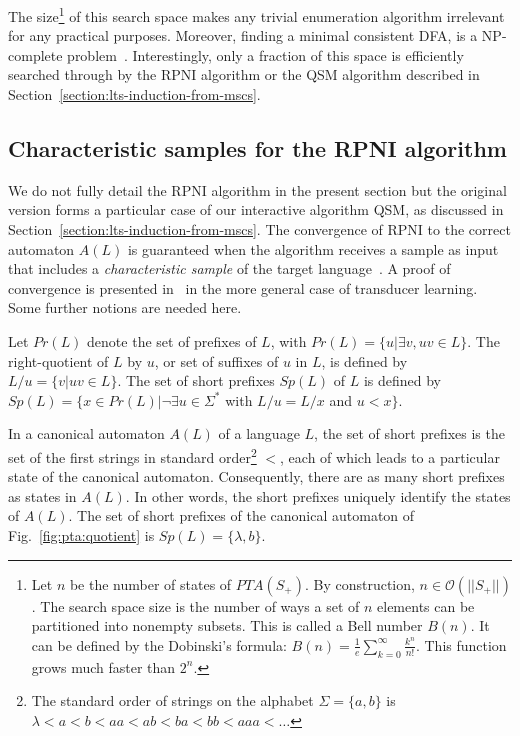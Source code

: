 The size\footnote{Let $n$ be the number of states of $PTA(S_+)$. By construction, $n \in \mathcal{O}(||S_+||)$. The search space size is the number of ways a set of $n$ elements can be partitioned into nonempty subsets. This is called a Bell number $B(n)$. It can be defined by the Dobinski's formula: $B(n) = \frac{1}{e} \sum_{k=0}^{\infty} \frac{k^n}{n!}$. This function grows much faster than $2^n$.} of this search space makes any trivial enumeration algorithm irrelevant for any practical purposes. Moreover, finding a minimal consistent DFA, is a NP-complete problem~\cite{Gold:1978,Angluin:1978}. Interestingly, only a fraction of this space is efficiently searched through by the RPNI algorithm or the \textsc{QSM} algorithm described in Section~\ref{section:lts-induction-from-mscs}.

\subsection{Characteristic samples for the RPNI algorithm\label{subsection:gi-background-rpni}}

We do not fully detail the RPNI algorithm in the present section but the original version forms a particular case
of our interactive algorithm \textsc{QSM}, as discussed in Section~\ref{section:lts-induction-from-mscs}. The convergence of RPNI to the correct automaton $A(L)$ is guaranteed when the algorithm receives a sample as input that includes a \textsl{characteristic sample} of the target language~\cite{Oncina:1992}. A proof of convergence is presented in~\cite{Oncina:1993} in the more general case of transducer learning. Some further notions are needed here.

\begin{definition} 
Let $Pr(L)$ denote the set of prefixes of $L$, with $Pr(L) = \{u | \exists v, uv \in L\}$. The right-quotient of $L$ by $u$, or set of suffixes of $u$ in $L$, is defined by $L/u = \{v | uv \in L\}$. The set of short prefixes $Sp(L)$ of $L$ is defined by $Sp(L) = \{x \in Pr(L) | \neg\exists u \in \Sigma^*$ with $L/u = L/x$ and $u < x\}$.
\end{definition}

In a canonical automaton $A(L)$ of a language $L$, the set of short prefixes is the set of the first strings in standard order\footnote{The standard order of strings on the alphabet $\Sigma=\{a,b\}$ is $\lambda < a < b < aa < ab < ba < bb < aaa < \ldots$} $<$, each of which leads to a particular state of the canonical automaton. Consequently, there are as many short prefixes as states in $A(L)$. In other words, the short prefixes uniquely identify the states of $A(L)$. The set of short prefixes of the canonical automaton of Fig.~\ref{fig:pta:quotient} is $Sp(L) = \{\lambda, b\}$.

